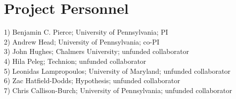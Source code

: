 \section*{Project Personnel}

1) Benjamin C. Pierce; University of Pennsylvania; PI \\
2) Andrew Head; University of Pennsylvania; co-PI \\
3) John Hughes; Chalmers University; unfunded collaborator \\
4) Hila Peleg; Technion; unfunded collaborator \\
5) Leonidas Lampropoulos; University of Maryland; unfunded collaborator \\
6) Zac Hatfield-Dodds; Hypothesis; unfunded collaborator \\
7) Chris Callison-Burch; University of Pennsylvania; unfunded collaborator

